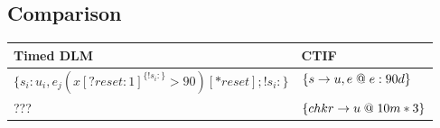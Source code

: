 \subsection{Comparison}

\begin{tabular}{|l|l|}
  \hline
  Timed DLM & CTIF \\ \hline
  $\{s_i : u_i, e_j (x[?reset : 1]^{\{ !s_i: \}} > 90)[*reset]; !s_i: \}$ & $\{s \rightarrow u, e \;@\; e: 90d \}$ \\ \hline
  ??? & $\{ chkr \rightarrow u \;@\; 10m * 3 \}$ \\ \hline

\end{tabular}
